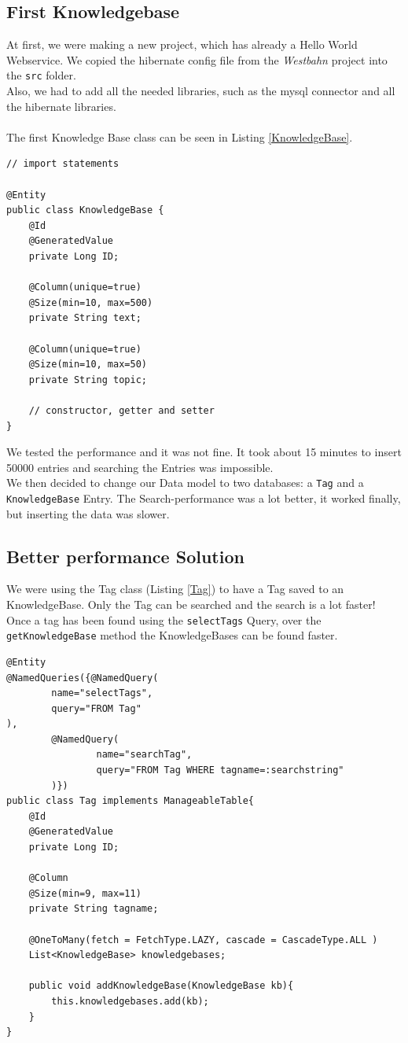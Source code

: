 \documentclass[12pt]{article}
\begin{document}
\subsection{First Knowledgebase}
At first, we were making a new project, which has already a Hello World Webservice. We copied the hibernate config file from the \textit{Westbahn} project into the \texttt{src} folder.\\
Also, we had to add all the needed libraries, such as the mysql connector and all the hibernate libraries.\\
\\
The first Knowledge Base class can be seen in Listing \ref{KnowledgeBase}.
\begin{lstlisting}[caption=KnowledgeBase entity class, label=KnowledgeBase]
// import statements

@Entity
public class KnowledgeBase {
    @Id
    @GeneratedValue
    private Long ID;

    @Column(unique=true)
    @Size(min=10, max=500)
    private String text;

    @Column(unique=true)
    @Size(min=10, max=50)
    private String topic;

	// constructor, getter and setter
}
\end{lstlisting}
We tested the performance and it was not fine.
It took about 15 minutes to insert 50000 entries and searching the Entries was impossible.
\\
We then decided to change our Data model to two databases: a \texttt{Tag} and a \texttt{KnowledgeBase} Entry.
The Search-performance was a lot better, it worked finally, but inserting the data was slower.
\subsection{Better performance Solution}
We were using the Tag class (Listing \ref{Tag}) to have a Tag saved to an KnowledgeBase. Only the Tag can be searched and the search is a lot faster! Once a tag has been found using the \texttt{selectTags} Query, over the \texttt{getKnowledgeBase} method the KnowledgeBases can be found faster.
\begin{lstlisting}[caption= Tag entity class (selection), label=Tag]
@Entity
@NamedQueries({@NamedQuery(
        name="selectTags",
        query="FROM Tag"
),
        @NamedQuery(
                name="searchTag",
                query="FROM Tag WHERE tagname=:searchstring"
        )})
public class Tag implements ManageableTable{
    @Id
    @GeneratedValue
    private Long ID;

    @Column
    @Size(min=9, max=11)
    private String tagname;

    @OneToMany(fetch = FetchType.LAZY, cascade = CascadeType.ALL )
    List<KnowledgeBase> knowledgebases;

    public void addKnowledgeBase(KnowledgeBase kb){
        this.knowledgebases.add(kb);
    }
}
\end{lstlisting}
\end{document}
